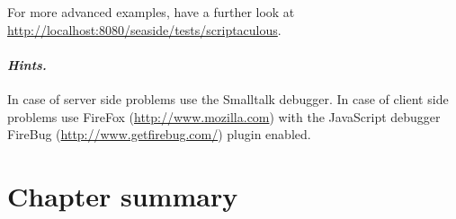 \documentclass[a4paper,10pt,twoside]{book}
\begin{document}
For more advanced examples, have a further look at \url{http://localhost:8080/seaside/tests/scriptaculous}.

\paragraph{\emph{Hints.}}
In case of server side problems use the Smalltalk debugger.
In case of client side problems use FireFox (\url{http://www.mozilla.com}) with the JavaScript debugger FireBug (\url{http://www.getfirebug.com/}) plugin enabled.

\section{Chapter summary}
\end{document}
